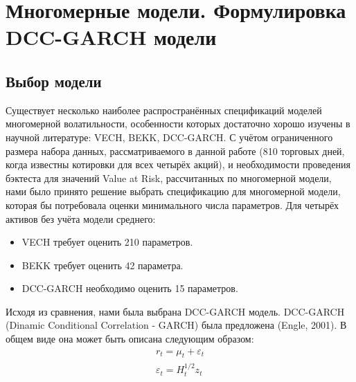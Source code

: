 \documentclass[a4paper,12pt,twoside]{article}
\begin{document}






\newpage
\section{Многомерные модели. Формулировка DCC-GARCH модели}\label{mgarch}

\subsection{Выбор модели}\label{model selection}

Существует несколько наиболее распространённых спецификаций моделей многомерной волатильности, особенности которых достаточно хорошо изучены в научной литературе: VECH, BEKK, DCC-GARCH. С учётом ограниченного размера набора данных, рассматриваемого в данной работе (810 торговых дней, когда известны котировки для всех четырёх акций), и необходимости проведения бэктеста для значений Value at Risk, рассчитанных по многомерной модели, нами было принято решение выбрать спецификацию для многомерной модели, которая бы потребовала оценки минимального числа параметров. Для четырёх активов без учёта модели среднего:
\begin{itemize}
    \item VECH требует оценить 210 параметров.
    \item BEKK требует оценить 42 параметра.
    \item DCC-GARCH необходимо оценить 15 параметров.
\end{itemize}

Исходя из сравнения, нами была выбрана DCC-GARCH модель. DCC-GARCH (Dinamic Conditional Correlation - GARCH) была предложена (Engle, 2001). В общем виде она может быть описана следующим образом:
\begin{equation}
\begin{aligned}
               r_t = \mu_t + \varepsilon_t \\
               \varepsilon_t = H^{1/2}_t z_t
\end{aligned}
\end{equation}
\end{document}
